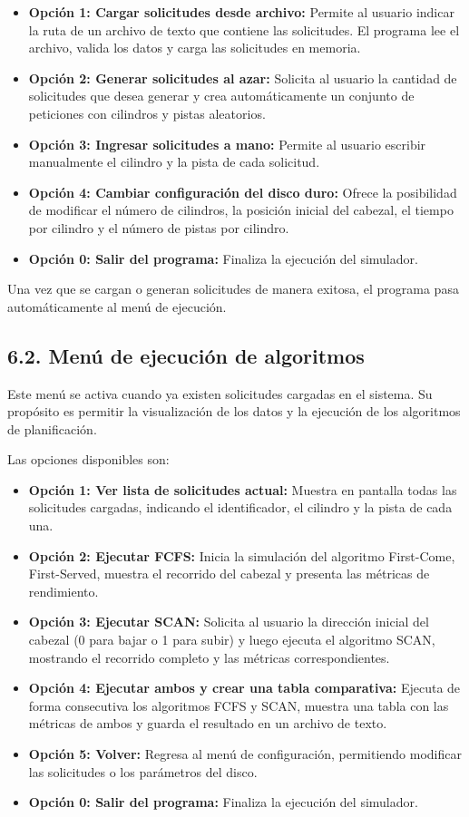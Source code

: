 \documentclass[14pt,letterpaper]{extarticle}
\begin{document}
\begin{itemize}
    \item \textbf{Opción 1: Cargar solicitudes desde archivo:} Permite al usuario indicar la ruta de un archivo de texto que contiene las solicitudes. El programa lee el archivo, valida los datos y carga las solicitudes en memoria.
    \item \textbf{Opción 2: Generar solicitudes al azar:} Solicita al usuario la cantidad de solicitudes que desea generar y crea automáticamente un conjunto de peticiones con cilindros y pistas aleatorios.
    \item \textbf{Opción 3: Ingresar solicitudes a mano:} Permite al usuario escribir manualmente el cilindro y la pista de cada solicitud.
    \item \textbf{Opción 4: Cambiar configuración del disco duro:} Ofrece la posibilidad de modificar el número de cilindros, la posición inicial del cabezal, el tiempo por cilindro y el número de pistas por cilindro.
    \item \textbf{Opción 0: Salir del programa:} Finaliza la ejecución del simulador.
\end{itemize}

Una vez que se cargan o generan solicitudes de manera exitosa, el programa pasa automáticamente al menú de ejecución.

\subsection*{6.2. Menú de ejecución de algoritmos}

Este menú se activa cuando ya existen solicitudes cargadas en el sistema. Su propósito es permitir la visualización de los datos y la ejecución de los algoritmos de planificación.

Las opciones disponibles son:

\begin{itemize}
    \item \textbf{Opción 1: Ver lista de solicitudes actual:} Muestra en pantalla todas las solicitudes cargadas, indicando el identificador, el cilindro y la pista de cada una.
    \item \textbf{Opción 2: Ejecutar FCFS:} Inicia la simulación del algoritmo First-Come, First-Served, muestra el recorrido del cabezal y presenta las métricas de rendimiento.
    \item \textbf{Opción 3: Ejecutar SCAN:} Solicita al usuario la dirección inicial del cabezal (0 para bajar o 1 para subir) y luego ejecuta el algoritmo SCAN, mostrando el recorrido completo y las métricas correspondientes.
    \item \textbf{Opción 4: Ejecutar ambos y crear una tabla comparativa:} Ejecuta de forma consecutiva los algoritmos FCFS y SCAN, muestra una tabla con las métricas de ambos y guarda el resultado en un archivo de texto.
    \item \textbf{Opción 5: Volver:} Regresa al menú de configuración, permitiendo modificar las solicitudes o los parámetros del disco.
    \item \textbf{Opción 0: Salir del programa:} Finaliza la ejecución del simulador.
\end{itemize}
\end{document}
